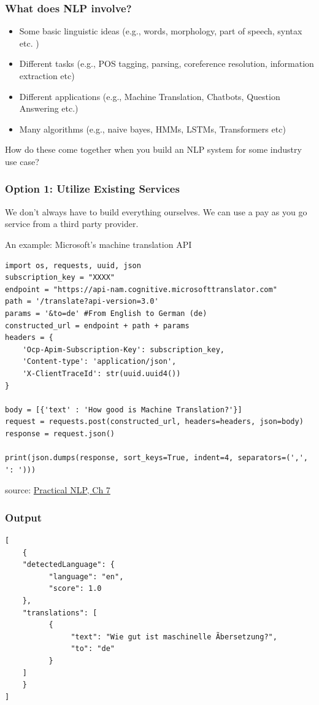 \documentclass{beamer}
\begin{document}
\begin{frame}
\frametitle{What does NLP involve?}
\begin{itemize}
    \item Some basic linguistic ideas (e.g., words, morphology, part of speech, syntax etc. )
    \item Different tasks (e.g., POS tagging, parsing, coreference resolution, information extraction etc)
    \item Different applications (e.g., Machine Translation, Chatbots, Question Answering etc.)
        \item Many algorithms (e.g., naive bayes, HMMs, LSTMs, Transformers etc)
\end{itemize}
How do these come together when you build an NLP system for some industry use case?
\end{frame}

\begin{frame}[fragile]
\frametitle{Option 1: Utilize Existing Services}

We don't always have to build everything ourselves. We can use a pay as you go service from a third party provider. 

\newline An example: Microsoft's machine translation API
\tiny
\begin{verbatim}
import os, requests, uuid, json
subscription_key = "XXXX"
endpoint = "https://api-nam.cognitive.microsofttranslator.com"
path = '/translate?api-version=3.0'
params = '&to=de' #From English to German (de)
constructed_url = endpoint + path + params
headers = {
    'Ocp-Apim-Subscription-Key': subscription_key,
    'Content-type': 'application/json',
    'X-ClientTraceId': str(uuid.uuid4())
}

body = [{'text' : 'How good is Machine Translation?'}]
request = requests.post(constructed_url, headers=headers, json=body)
response = request.json()

print(json.dumps(response, sort_keys=True, indent=4, separators=(',', ': ')))
\end{verbatim}
source: \href{https://github.com/practical-nlp/practical-nlp/blob/master/Ch7/05_MachineTranslation.ipynb}{Practical NLP, Ch 7}
\end{frame}

\begin{frame}[fragile]
\frametitle{Output}
\small
\begin{verbatim}
[
    {
    "detectedLanguage": {
          "language": "en",
          "score": 1.0
    },
    "translations": [
          {
               "text": "Wie gut ist maschinelle Ãbersetzung?",
               "to": "de"
          }
    ]
    }
]
\end{verbatim}
\end{frame}
\end{document}
